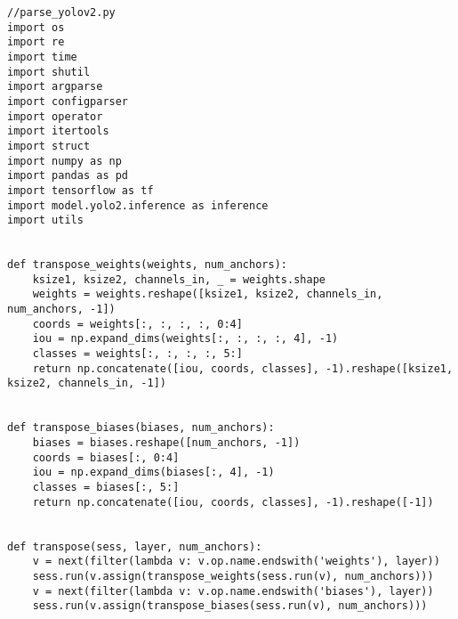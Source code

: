 \pagebreak
\begin{lstlisting}
//parse_yolov2.py
import os
import re
import time
import shutil
import argparse
import configparser
import operator
import itertools
import struct
import numpy as np
import pandas as pd
import tensorflow as tf
import model.yolo2.inference as inference
import utils


def transpose_weights(weights, num_anchors):
    ksize1, ksize2, channels_in, _ = weights.shape
    weights = weights.reshape([ksize1, ksize2, channels_in, num_anchors, -1])
    coords = weights[:, :, :, :, 0:4]
    iou = np.expand_dims(weights[:, :, :, :, 4], -1)
    classes = weights[:, :, :, :, 5:]
    return np.concatenate([iou, coords, classes], -1).reshape([ksize1, ksize2, channels_in, -1])


def transpose_biases(biases, num_anchors):
    biases = biases.reshape([num_anchors, -1])
    coords = biases[:, 0:4]
    iou = np.expand_dims(biases[:, 4], -1)
    classes = biases[:, 5:]
    return np.concatenate([iou, coords, classes], -1).reshape([-1])


def transpose(sess, layer, num_anchors):
    v = next(filter(lambda v: v.op.name.endswith('weights'), layer))
    sess.run(v.assign(transpose_weights(sess.run(v), num_anchors)))
    v = next(filter(lambda v: v.op.name.endswith('biases'), layer))
    sess.run(v.assign(transpose_biases(sess.run(v), num_anchors)))



\end{lstlisting}
